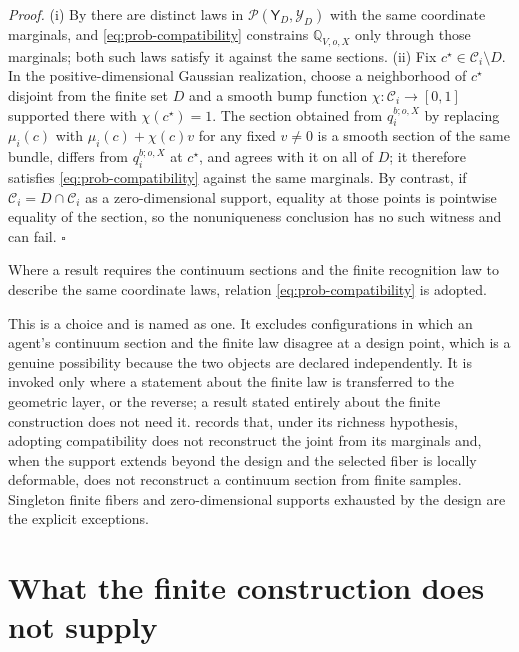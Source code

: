 \noindent\emph{Proof.} (i) By  there are distinct laws in $\mathcal P(\mathsf Y_D,\mathscr Y_D)$ with the same coordinate marginals, and \eqref{eq:prob-compatibility} constrains $\mathbb Q_{V,o,X}$ only through those marginals; both such laws satisfy it against the same sections. (ii) Fix \(c^{\star}\in\mathcal C_i\setminus D\). In the positive-dimensional Gaussian realization, choose a neighborhood of \(c^\star\) disjoint from the finite set \(D\) and a smooth bump function $\chi:\mathcal C_i\to[0,1]$ supported there with $\chi(c^{\star})=1$. The section obtained from $q_i^{b;o,X}$ by replacing $\mu_i(c)$ with $\mu_i(c)+\chi(c)v$ for any fixed $v\neq0$ is a smooth section of the same bundle, differs from $q_i^{b;o,X}$ at $c^{\star}$, and agrees with it on all of $D$; it therefore satisfies \eqref{eq:prob-compatibility} against the same marginals. By contrast, if \(\mathcal C_i=D\cap\mathcal C_i\) as a zero-dimensional support, equality at those points is pointwise equality of the section, so the nonuniqueness conclusion has no such witness and can fail. \hfill$\square$

\medskip
{}
Where a result requires the continuum sections and the finite recognition law to describe the same coordinate laws, relation \eqref{eq:prob-compatibility} is adopted. 
\medskip

This is a choice and is named as one. It excludes configurations in which an agent's continuum section and the finite law disagree at a design point, which is a genuine possibility because the two objects are declared independently. It is invoked only where a statement about the finite law is transferred to the geometric layer, or the reverse; a result stated entirely about the finite construction does not need it.  records that, under its richness hypothesis, adopting compatibility does not reconstruct the joint from its marginals and, when the support extends beyond the design and the selected fiber is locally deformable, does not reconstruct a continuum section from finite samples. Singleton finite fibers and zero-dimensional supports exhausted by the design are the explicit exceptions.

\section{What the finite construction does not supply}
\label{sec:prob-continuum}

